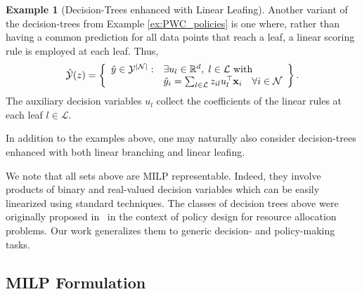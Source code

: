 \documentclass[letterpaper]{article} %
\theoremstyle{definition}
\newtheorem{example}{Example}[section]
\newcommand{\1}{\ensuremath{{\rm e}}} %
\begin{document}

\begin{example}[Decision-Trees enhanced with Linear Leafing]
\label{ex:PWL_policies}
Another variant of the decision-trees from Example \ref{ex:PWC_policies} is one where, rather than having a common prediction for all data points that reach a leaf, a linear scoring rule is employed at each leaf. Thus,
$$
\hat {\mathcal Y}(z) = \left\{
\begin{array}{ll}
 \hat y \in \mathcal Y^{| \mathcal N |} : &
 \exists u_l \in \mathbb R^{d}, \; l\in \mathcal L \text{ with } \\
 &  \hat y_i = \textstyle \sum_{l \in \mathcal L} z_{il} u_l^\top {\bf x}_i \quad \forall i \in \mathcal N
\end{array}
\right\}.
$$
The auxiliary decision variables $u_l$ collect the coefficients of the linear rules at each leaf $l\in \mathcal L$. 
\end{example}

In addition to the examples above, one may naturally also consider decision-trees enhanced with both linear branching and linear leafing. 

We note that all sets above are MILP representable. Indeed, they involve products of binary and real-valued decision variables which can be easily linearized using standard techniques. The classes of decision trees above were originally proposed in~\cite{Azizi2018_CPAIOR} in the context of policy design for resource allocation problems. Our work generalizes them to generic decision- and policy-making tasks.



\subsection{MILP Formulation}
\label{sec:MILP-actual}
\end{document}
